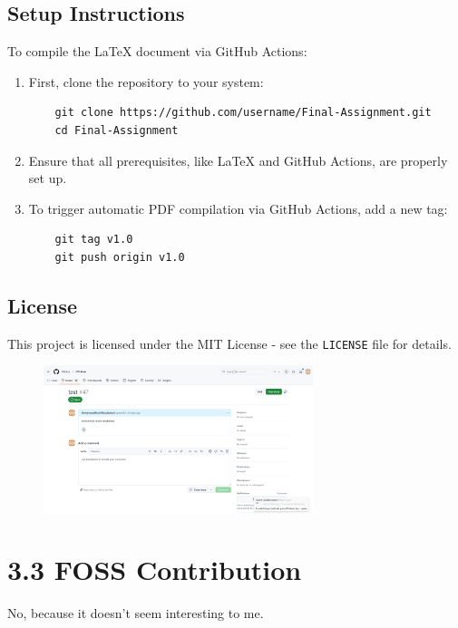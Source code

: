 \documentclass{article}
\begin{document}
\subsection*{Setup Instructions}

To compile the LaTeX document via GitHub Actions:

\begin{enumerate}
    \item First, clone the repository to your system:
    \begin{verbatim}
    git clone https://github.com/username/Final-Assignment.git
    cd Final-Assignment
    \end{verbatim}

    \item Ensure that all prerequisites, like LaTeX and GitHub Actions, are properly set up.
    
    \item To trigger automatic PDF compilation via GitHub Actions, add a new tag:
    \begin{verbatim}
    git tag v1.0
    git push origin v1.0
    \end{verbatim}
\end{enumerate}

\subsection*{License}

This project is licensed under the MIT License - see the \texttt{LICENSE} file for details.



\begin{figure}[h!]
    \centering
    \includegraphics[width=0.7\textwidth]{mili.png}
\end{figure}









\section*{3.3 FOSS Contribution}

No, because it doesn't seem interesting to me.
\end{document}

